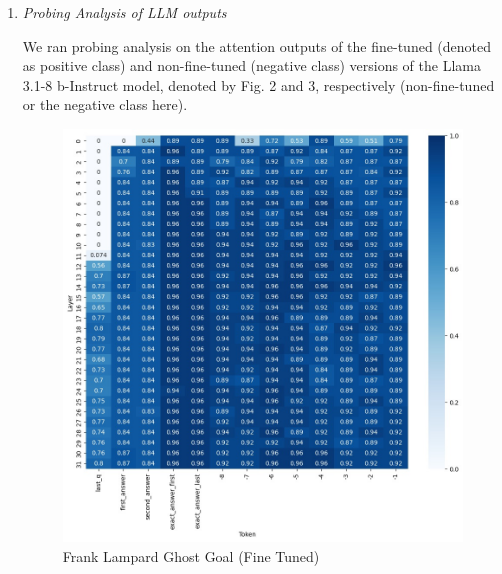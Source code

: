 \documentclass[sigconf, review]{acmart}
\begin{document}
\begin{enumerate}
\begin{enumerate}
        \end{enumerate} %
      
 \item \textit{Probing Analysis of LLM outputs}

     

     We ran probing analysis \cite{orgad2024llms} on the attention outputs of the fine-tuned (denoted as positive class) and non-fine-tuned (negative class) versions of the Llama 3.1-8 b-Instruct model, denoted by Fig. 2 and 3, respectively (non-fine-tuned or the negative class here).

     \begin{figure}[ht]
         \centering
         \begin{minipage}{0.35\textwidth}
             \centering
             \includegraphics[width=\linewidth]{frank-positive-class.jpg}
             \caption{\footnotesize Frank Lampard Ghost Goal (Fine Tuned)}
             \label{fig:frank-positive-class}
         \end{minipage}
         \hfill
         \begin{minipage}{0.35\textwidth}

\end{minipage}
\end{figure}
\end{enumerate}
\end{document}

